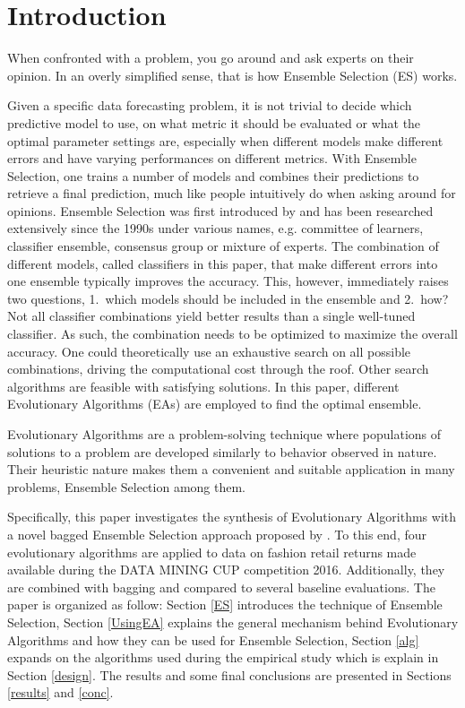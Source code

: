 \section{Introduction} 
When confronted with a problem, you go around and ask experts on their opinion. In an overly simplified sense, that is how Ensemble Selection (ES) works.

Given a specific data forecasting problem, it is not trivial to decide which predictive model to use, on what metric it should be evaluated or what the optimal parameter settings are, especially when different models make different errors and have varying performances on different metrics. With Ensemble Selection, one trains a number of models and combines their predictions to retrieve a final prediction, much like people intuitively do when asking around for opinions. Ensemble Selection was first introduced by \cite{dasarathy1979composite} and has been researched extensively since the 1990s under various names, e.g. committee of learners, classifier ensemble, consensus group or mixture of experts. The combination of different models, called classifiers in this paper, that make different errors into one ensemble typically improves the accuracy. This, however, immediately raises two questions, \mbox{1. }which models should be included in the ensemble and \mbox{2. }how? Not all classifier combinations yield better results than a single well-tuned classifier. As such, the combination needs to be optimized to maximize the overall accuracy. One could theoretically use an exhaustive search on all possible combinations, driving the computational cost through the roof. Other search algorithms are feasible with satisfying solutions. In this paper, different Evolutionary Algorithms (EAs) are employed to find the optimal ensemble. 

Evolutionary Algorithms are a problem-solving technique where populations of solutions to a problem are developed similarly to behavior observed in nature. Their heuristic nature makes them a convenient and suitable application in many problems, Ensemble Selection among them. 

Specifically, this paper investigates the synthesis of Evolutionary Algorithms with a novel bagged Ensemble Selection approach proposed by \cite{caruana2004ensemble}. To this end, four evolutionary algorithms are applied to data on fashion retail returns made available during the DATA MINING CUP competition 2016. Additionally, they are combined with bagging and compared to several baseline evaluations. The paper is organized as follow: Section \ref{ES} introduces the technique of Ensemble Selection, Section \ref{UsingEA} explains the general mechanism behind Evolutionary Algorithms and how they can be used for Ensemble Selection, Section \ref{alg} expands on the algorithms used during the empirical study which is explain in Section \ref{design}. The results and some final conclusions are presented in Sections \ref{results} and \ref{conc}.





